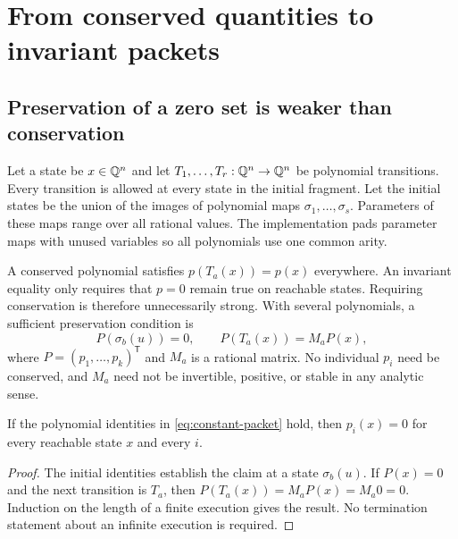 \section{From conserved quantities to invariant packets}
\label{sec:packets}

\subsection{Preservation of a zero set is weaker than conservation}
Let a state be $x\in\mathbb{Q}^n$ and let $T_1,\ldots,T_r:\mathbb{Q}^n\to\mathbb{Q}^n$ be polynomial
transitions. Every transition is allowed at every state in the initial fragment.
Let the initial states be the union of the images of polynomial maps
$\sigma_1,\ldots,\sigma_s$. Parameters of these maps range over all rational
values. The implementation pads parameter maps with unused variables so all
polynomials use one common arity.

A conserved polynomial satisfies $p(T_a(x))=p(x)$ everywhere. An invariant
equality only requires that $p=0$ remain true on reachable states. Requiring
conservation is therefore unnecessarily strong. With several polynomials, a
sufficient preservation condition is
\begin{equation}
\label{eq:constant-packet}
 P(\sigma_b(u))=0,
 \qquad P(T_a(x))=M_a P(x),
\end{equation}
where $P=(p_1,\ldots,p_k)^{\mathsf T}$ and $M_a$ is a rational matrix. No
individual $p_i$ need be conserved, and $M_a$ need not be invertible, positive,
or stable in any analytic sense.

\begin{theorem}
\label{thm:packet}
If the polynomial identities in \eqref{eq:constant-packet} hold, then
$p_i(x)=0$ for every reachable state $x$ and every $i$.
\end{theorem}
\begin{proof}
The initial identities establish the claim at a state $\sigma_b(u)$. If
$P(x)=0$ and the next transition is $T_a$, then
$P(T_a(x))=M_a P(x)=M_a0=0$. Induction on the length of a finite execution gives
the result. No termination statement about an infinite execution is required.
\end{proof}

